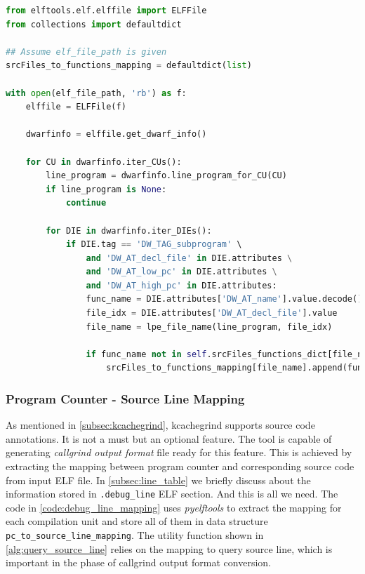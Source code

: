 \begin{center}
\begin{minipage}{\textwidth}
\begin{lstlisting}[language=Python]
from elftools.elf.elffile import ELFFile
from collections import defaultdict

## Assume elf_file_path is given
srcFiles_to_functions_mapping = defaultdict(list)

with open(elf_file_path, 'rb') as f:
    elffile = ELFFile(f)
    
    dwarfinfo = elffile.get_dwarf_info()
    
    for CU in dwarfinfo.iter_CUs():
        line_program = dwarfinfo.line_program_for_CU(CU)
        if line_program is None:
            continue
    
        for DIE in dwarfinfo.iter_DIEs():
            if DIE.tag == 'DW_TAG_subprogram' \
                and 'DW_AT_decl_file' in DIE.attributes \
                and 'DW_AT_low_pc' in DIE.attributes \
                and 'DW_AT_high_pc' in DIE.attributes:
                func_name = DIE.attributes['DW_AT_name'].value.decode()
                file_idx = DIE.attributes['DW_AT_decl_file'].value
                file_name = lpe_file_name(line_program, file_idx)
                
                if func_name not in self.srcFiles_functions_dict[file_name]:
                    srcFiles_to_functions_mapping[file_name].append(func_name)
\end{lstlisting}
\end{minipage}
\end{center}

\subsubsection{Program Counter - Source Line Mapping}
\label{subsubsec:pc_line_mapping}

As mentioned in \ref{subsec:kcachegrind}, kcachegrind supports source code annotations. It is not a must but an optional feature. The tool is capable of generating \textit{callgrind output format} file ready for this feature. This is achieved by extracting the mapping between program counter and corresponding source code from input ELF file. In \ref{subsec:line_table} we briefly discuss about the information stored in \texttt{.debug\_line} ELF section. And this is all we need. The code in \ref{code:debug_line_mapping} uses \textit{pyelftools} to extract the mapping for each compilation unit and store all of them in data structure \texttt{pc\_to\_source\_line\_mapping}. The utility function shown in \ref{alg:query_source_line} relies on the mapping to query source line, which is important in the phase of callgrind output format conversion.

